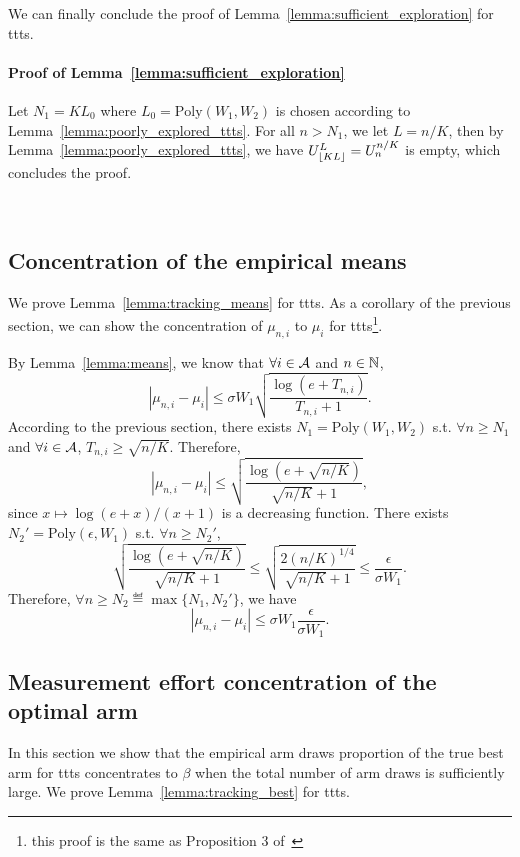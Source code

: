 We can finally conclude the proof of Lemma~\ref{lemma:sufficient_exploration} for \gls{ttts}.

\paragraph{Proof of Lemma~\ref{lemma:sufficient_exploration}}
Let $N_1 = KL_0$ where $L_0 = \text{Poly}(W_1,W_2)$ is chosen according to Lemma~\ref{lemma:poorly_explored_ttts}. For all $n > N_1$, we let $L=n/K$, then by Lemma~\ref{lemma:poorly_explored_ttts}, we have $U_{\lfloor KL\rfloor}^L = U_n^{n/K}$ is empty, which concludes the proof.

\hfill\BlackBox\\[2mm]

\subsection{Concentration of the empirical means}\label{app:confidence_ttts.means}

We prove Lemma~\ref{lemma:tracking_means} for \gls{ttts}. As a corollary of the previous section, we can show the concentration of $\mu_{n,i}$ to $\mu_i$ for \gls{ttts}\footnote{this proof is the same as Proposition 3 of~\cite{qin2017ttei}}.

By Lemma~\ref{lemma:means}, we know that $\forall i\in\mathcal{A}$ and $n\in{\mathbb N}$,
\[
    |\mu_{n,i}-\mu_i| \leq \sigma W_1 \sqrt{\frac{\log(e+T_{n,i})}{T_{n,i}+1}}.
\]
According to the previous section, there exists $N_1 = \text{Poly}(W_1,W_2)$ s.t. $\forall n \geq N_1$ and $\forall i\in\mathcal{A}$, $T_{n,i} \geq \sqrt{n/K}$. Therefore,
\[
    |\mu_{n,i}-\mu_i| \leq \sqrt{\frac{\log(e+\sqrt{n/K})}{\sqrt{n/K}+1}},
\]
since $x \mapsto \log(e+x)/(x+1)$ is a decreasing function. There exists $N_2' = \text{Poly}(\epsilon,W_1)$ s.t. $\forall n \geq N_2'$,
\[
    \sqrt{\frac{\log(e+\sqrt{n/K})}{\sqrt{n/K}+1}} \leq \sqrt{\frac{2(n/K)^{1/4}}{\sqrt{n/K}+1}} \leq \frac{\epsilon}{\sigma W_1}.
\]
Therefore, $\forall n \geq N_2 \eqdef \max\{N_1,N_2'\}$, we have
\[
    |\mu_{n,i}-\mu_i| \leq \sigma W_1 \frac{\epsilon}{\sigma W_1}.
\]

\subsection{Measurement effort concentration of the optimal arm}\label{app:confidence_ttts.best_arm}

In this section we show that the empirical arm draws proportion of the true best arm for \gls{ttts} concentrates to $\beta$ when the total number of arm draws is sufficiently large. We prove Lemma~\ref{lemma:tracking_best} for \gls{ttts}.

